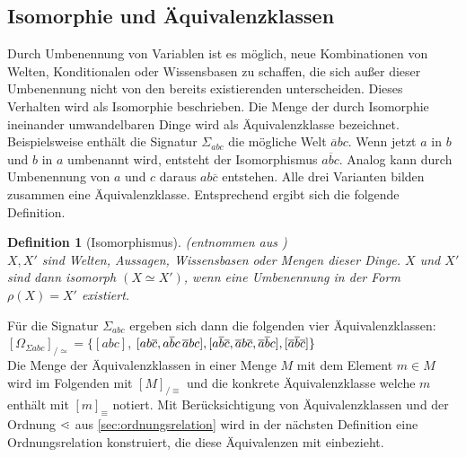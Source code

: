 \documentclass[12pt,a4paper]{article}
\newtheorem{theorem}{Definition}
\newcommand\dotl{\mathrel{%
    \mathchoice{\QEQ}{\QEQ}{\QEQ}{\QEQ}%
}}
\def\QEQ{{%
    \setbox0\hbox{<}%
    \rlap{\hbox to \wd0{\hss \raisebox {0.1pt}{$\ \cdot$\hss}}}\box0
}}
\begin{document}
\subsection{Isomorphie und Äquivalenzklassen}
\label{sec:äquivalenz-wissensbasen}
Durch Umbenennung von Variablen ist es möglich, neue Kombinationen von Welten, Konditionalen oder Wissensbasen zu schaffen, die sich außer dieser Umbenennung nicht von den bereits existierenden unterscheiden. Dieses Verhalten wird als Isomorphie beschrieben. Die Menge der durch Isomorphie ineinander umwandelbaren Dinge wird als Äquivalenzklasse bezeichnet. Beispielsweise enthält die Signatur $\Sigma_{abc}$ die mögliche Welt $\overline{a}bc$. Wenn jetzt $a$ in $b$ und $b$ in $a$ umbenannt wird, entsteht der Isomorphismus $a\overline{b}c$. Analog kann durch Umbenennung von $a$ und $c$ daraus $ab\overline{c}$ entstehen. Alle drei Varianten bilden zusammen eine Äquivalenzklasse. Entsprechend ergibt sich die folgende Definition.
\begin{theorem}[Isomorphismus](entnommen aus \cite{beierle19}) \ \\
$X, X'$ sind Welten, Aussagen, Wissensbasen oder Mengen dieser Dinge. $X$ und $X'$ sind dann isomorph $(X \simeq X')$, wenn eine Umbenennung in der Form $\rho(X) = X'$ existiert.
\end{theorem}
Für die Signatur $\Sigma_{abc}$ ergeben sich dann die folgenden vier Äquivalenzklassen: \\
$[\Omega_{\Sigma abc}]_{/\simeq}=\{[abc]$, $[ab\overline{c}, a\overline{b}c\, \overline{a}bc], [a\overline{b}\overline{c}, \overline{a\\}b\overline{c}, \overline{a}\overline{b}c], [\overline{a}\overline{b}\overline{c}]\}$ \\
Die Menge der Äquivalenzklassen in einer Menge $M$ mit dem Element $m \in M$ wird im Folgenden mit $[M]_{/\equiv}$ und die konkrete Äquivalenzklasse welche $m$ enthält mit $[m]_\equiv$ notiert. Mit Berücksichtigung von Äquivalenzklassen und der Ordnung $\dotl$ aus \autoref{sec:ordnungsrelation} wird in der nächsten Definition eine Ordnungsrelation konstruiert, die diese Äquivalenzen mit einbezieht.
\end{document}
